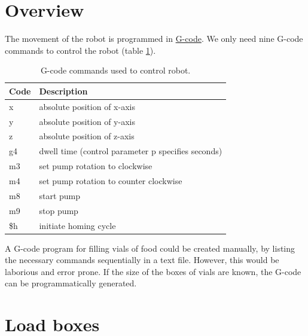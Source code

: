 \documentclass[
]{book}
\begin{document}
\hypertarget{overview-2}{%
\section{Overview}\label{overview-2}}

The movement of the robot is programmed in \href{https://en.wikipedia.org/wiki/G-code}{G-code}. We only need nine G-code commands to control the robot (table \ref{tab:gCodes}).

\begin{table}

\caption{\label{tab:gCodes}G-code commands used to control robot.}
\centering
\begin{tabular}[t]{ll}
\toprule
Code & Description\\
\midrule
x & absolute position of x-axis\\
y & absolute position of y-axis\\
z & absolute position of z-axis\\
g4 & dwell time (control parameter p specifies seconds)\\
m3 & set pump rotation to clockwise\\
\addlinespace
m4 & set pump rotation to counter clockwise\\
m8 & start pump\\
m9 & stop pump\\
\$h & initiate homing cycle\\
\bottomrule
\end{tabular}
\end{table}

A G-code program for filling vials of food could be created manually, by listing the necessary commands sequentially in a text file. However, this would be laborious and error prone. If the size of the boxes of vials are known, the G-code can be programmatically generated.

\hypertarget{loadBoxes}{%
\section{Load boxes}\label{loadBoxes}}
\end{document}
